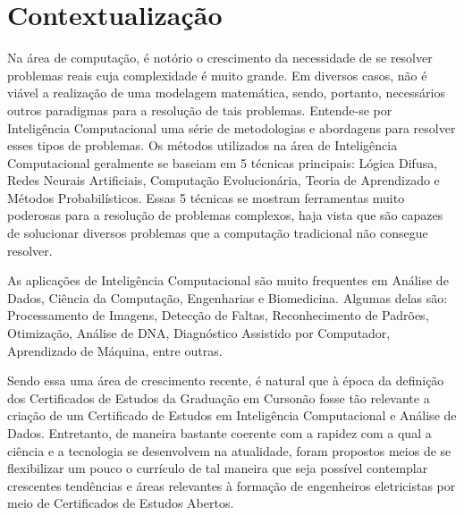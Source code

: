 \documentclass{article}
\newcommand{\curso}{Curso} %
\begin{document}
	\section{Contextualização} \label{sec:Cont}
	Na área de computação, é notório o crescimento da necessidade de se resolver problemas reais cuja complexidade é muito grande. Em diversos casos, não é viável a realização de uma modelagem matemática, sendo, portanto, necessários outros paradigmas para a resolução de tais problemas. Entende-se por Inteligência Computacional uma série de metodologias e abordagens para resolver esses tipos de problemas.
	Os métodos utilizados na área de Inteligência Computacional geralmente se baseiam em 5 técnicas principais: Lógica Difusa, Redes Neurais Artificiais, Computação Evolucionária, Teoria de Aprendizado e Métodos Probabilísticos. Essas 5 técnicas se mostram ferramentas muito poderosas para a resolução de problemas complexos, haja vista que são capazes de solucionar diversos problemas que a computação tradicional não consegue resolver.  \par
	As aplicações de Inteligência Computacional são muito frequentes em Análise de Dados, Ciência da Computação, Engenharias e Biomedicina. Algumas delas são: Processamento de Imagens, Detecção de Faltas, Reconhecimento de Padrões, Otimização, Análise de DNA, Diagnóstico Assistido por Computador, Aprendizado de Máquina, entre outras. \par
	Sendo essa uma área de crescimento recente, é natural que à época da definição dos Certificados de Estudos da Graduação em \curso não fosse tão relevante a criação de um Certificado de Estudos em Inteligência Computacional e Análise de Dados. Entretanto, de maneira bastante coerente com a rapidez com a qual a ciência e a tecnologia se desenvolvem na atualidade, foram propostos meios de se flexibilizar um pouco o currículo de tal maneira que seja possível contemplar crescentes tendências e áreas relevantes à formação de engenheiros eletricistas por meio de Certificados de Estudos Abertos.
	
\end{document}
